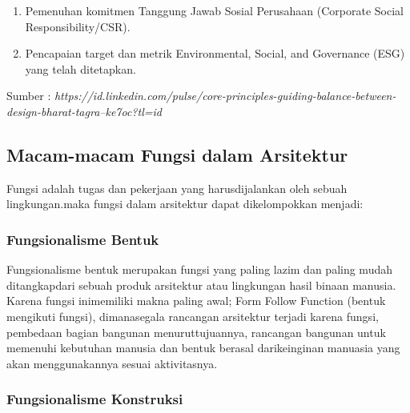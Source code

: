 \documentclass[../manperil.tex]{subfiles}
\begin{document}
\begin{enumerate}
	\item Pemenuhan komitmen Tanggung Jawab Sosial Perusahaan (Corporate Social Responsibility/CSR).
	\item Pencapaian target dan metrik Environmental, Social, and Governance (ESG) yang telah ditetapkan.
\end{enumerate}




Sumber : \textit{https://id.linkedin.com/pulse/core-principles-guiding-balance-between-design-bharat-tagra--ke7oc?tl=id}

\subsection{Macam-macam Fungsi dalam Arsitektur}%
\label{sub:macam-macam_fungsi_dalam_arsitektur}

Fungsi adalah tugas dan pekerjaan yang harusdijalankan oleh sebuah lingkungan.maka fungsi dalam arsitektur dapat dikelompokkan menjadi:

\subsubsection{Fungsionalisme Bentuk}%
\label{ssub:fungsionalisme_bentuk}


Fungsionalisme bentuk merupakan fungsi yang paling lazim dan paling mudah ditangkapdari sebuah produk arsitektur atau lingkungan hasil binaan manusia. Karena fungsi inimemiliki makna paling awal; Form Follow Function (bentuk mengikuti fungsi), dimanasegala rancangan arsitektur terjadi karena fungsi, pembedaan bagian bangunan menuruttujuannya, rancangan bangunan untuk memenuhi kebutuhan manusia dan bentuk berasal darikeinginan manuasia yang akan menggunakannya sesuai aktivitasnya.

\subsubsection{Fungsionalisme Konstruksi}%
\label{ssub:fungsionalisme_konstruksi}
\end{document}
